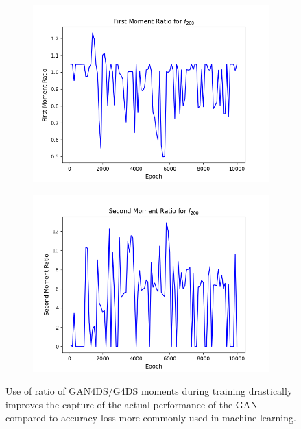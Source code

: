 \documentclass[11pt]{article} %
\begin{document}
\begin{figure}[H]
\begin{minipage}{\textwidth}
\begin{subfigure}{.5\textwidth}
      \includegraphics[scale=0.6]{./images/moment_1_f200like.png}
  \end{subfigure}
  \begin{subfigure}{.5\textwidth}
      \includegraphics[scale=0.6]{./images/moment_2_f200like.png}
  \end{subfigure}
\end{minipage}
\caption{Use of ratio of GAN4DS/G4DS moments during training drastically improves the capture of the actual performance of the GAN
compared to accuracy-loss more commonly used in machine learning.}
\label{fig:moments}
\end{figure}
\end{document}
